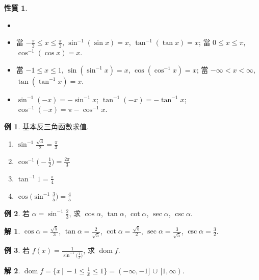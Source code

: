 \documentclass[12pt]{extarticle}
\newcommand{\ds}{\displaystyle}
\DeclareMathOperator*{\dom}{dom}
\theoremstyle{definition}
\newtheorem*{prp}{性質}
\newtheorem*{ex}{例}
\newtheorem*{sol}{解}
\begin{document}
\begin{prp}
  \begin{itemize}\setlength\itemsep{0em}
    \item[]
    \item 當 $\ds-\frac{\pi}{2}\leqslant x\leqslant\frac{\pi}{2}$, $\sin^{-1}(\sin x) = x$, $\tan^{-1}(\tan x) = x$; 當 $\ds 0\leqslant x\leqslant\pi$, $\cos^{-1}(\cos x) = x$.  
    \item 當 $\ds-1\leqslant x\leqslant1$, $\sin(\sin^{-1} x) = x$, $\cos(\cos^{-1} x) = x$; 當 $\ds-\infty < x < \infty$, $\tan(\tan^{-1} x) = x$. 
    \item $\sin^{-1}(-x) = -\sin^{-1}x$; $\tan^{-1}(-x) = -\tan^{-1}x$; $\cos^{-1}(-x) = \pi - \cos^{-1}x$. 
  \end{itemize}
\end{prp}

\begin{ex} 基本反三角函數求值. 
  \setlength{\columnsep}{-5mm}
  \begin{multicols}{4}
  \begin{enumerate}
    \item $\ds\sin^{-1}\frac{\sqrt{3}}{2} = \frac{\pi}{3}$
    \item $\ds\cos^{-1}\Big(-\frac{1}{2}\Big) = \frac{2\pi}{3}$%
    \item $\ds\tan^{-1}1 = \frac{\pi}{4}$ 
    \item $\ds\cos\Big(\sin^{-1}\frac{3}{5}\Big) = \frac{4}{5}$
  \end{enumerate}
\end{multicols}
\end{ex}

\begin{ex}
  若 $\ds\alpha = \sin^{-1}\frac{2}{3}$, 求 $\cos\alpha$, $\tan\alpha$, $\cot\alpha$, $\sec\alpha$, $\csc\alpha$. 
\end{ex}

\begin{sol}
  $\ds\cos\alpha = \frac{\sqrt{5}}{3}$, $\ds\tan\alpha = \frac{2}{\sqrt{5}}$, $\ds\cot\alpha = \frac{\sqrt{5}}{2}$, $\ds\sec\alpha = \frac{3}{\sqrt{5}}$, $\ds\csc\alpha = \frac{3}{2}$. 
\end{sol}

\begin{ex}
  若 $\ds f(x) = \frac{1}{\sin^{-1}\big(\frac{1}{x}\big)}$, 求 $\dom{f}$. 
\end{ex}

\begin{sol}
  $\dom f = \big\{x\,|\, -1\leqslant\frac{1}{x}\leqslant 1\big\} = (-\infty,-1]\,\cup\,[1,\infty)$. 
\end{sol}
\end{document}
